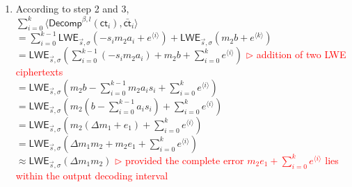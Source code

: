 \begin{myproof}
\begin{enumerate}
$\gap{$\cdots$} + \textsf{LWE}_{\vec{s}, \sigma}\left(-a_{\langle i, l\rangle}s_im_2\dfrac{q}{\beta^l} + a_{\langle i, l \rangle}e_{i,l}\right)\Bigg)$ \\
$= \sum\limits_{i=0}^{k-1}\textsf{LWE}_{\vec{s}, \sigma}\left(-a_{\langle i, 1\rangle}s_im_2\dfrac{q}{\beta^1} -a_{\langle i, 2\rangle}s_im_2\dfrac{q}{\beta^2} + \gap{$\cdots$} -a_{\langle i, l\rangle}s_im_2\dfrac{q}{\beta^l} + a_{\langle i, 1 \rangle}e_{i,1} + \cdots + a_{\langle i, l \rangle}e_{i,l}\right)$ \\
$= \sum\limits_{i=0}^{k-1}\textsf{LWE}_{\vec{s}, \sigma}\left(-s_im_2 \cdot \left(a_{\langle i, 1\rangle}\dfrac{q}{\beta^1} + a_{\langle i, 2\rangle}\dfrac{q}{\beta^2} + \gap{$\cdots$} + a_{\langle i, l\rangle}\dfrac{q}{\beta^l}\right) + a_{\langle i, 1 \rangle}e_{i,1} + \cdots + a_{\langle i, l \rangle}e_{i,l}\right)$ \\
$= \sum\limits_{i=0}^{k-1}\textsf{LWE}_{\vec{s}, \sigma}(-s_im_2a_i + e^{\langle i \rangle})$ \textcolor{red}{ $\rhd$ where $e^{\langle i \rangle} = a_{\langle i, 1 \rangle}e_{i,1} + \cdots + a_{\langle i, l \rangle}e_{i,l}$}
\item According to step 2 and 3, \\
$\sum\limits_{i=0}^{k}\langle \textsf{Decomp}^{\beta, l}(\textsf{ct}_i), \bar{\textsf{ct}}_i \rangle$ \\
$= \sum\limits_{i=0}^{k-1}\textsf{LWE}_{\vec{s}, \sigma}(-s_im_2a_i + e^{\langle i \rangle}) + \textsf{LWE}_{\vec{s}, \sigma} (m_{2}b + e^{\langle k \rangle})$ \\ 
$= \textsf{LWE}_{\vec{s}, \sigma}\left(\sum\limits_{i=0}^{k-1}(-s_im_2a_i) + m_{2}b + \sum\limits_{i=0}^ke^{\langle i \rangle}\right)$ \textcolor{red}{ $\rhd$ addition of two LWE ciphertexts} \\ 
$= \textsf{LWE}_{\vec{s}, \sigma}\left(m_2b - \sum\limits_{i=0}^{k-1}m_2a_is_i + \sum\limits_{i=0}^ke^{\langle i \rangle}\right)$  \\ 
$= \textsf{LWE}_{\vec{s}, \sigma}\left(m_2(b - \sum\limits_{i=0}^{k-1}a_is_i) + \sum\limits_{i=0}^ke^{\langle i \rangle}\right)$\\
$= \textsf{LWE}_{\vec{s}, \sigma}\left(m_2(\Delta m_1 + e_1) + \sum\limits_{i=0}^ke^{\langle i \rangle}\right)$ \\
$= \textsf{LWE}_{\vec{s}, \sigma}\left(\Delta m_1m_2 + m_2e_1 + \sum\limits_{i=0}^ke^{\langle i \rangle}\right)$ \\
$\approx \textsf{LWE}_{\vec{s}, \sigma}(\Delta m_1m_2)$ \textcolor{red}{ $\rhd$ provided the complete error $m_2e_1+\sum\limits_{i=0}^ke^{\langle i\rangle}$ lies within the output decoding interval}
\end{enumerate}

\end{myproof}

